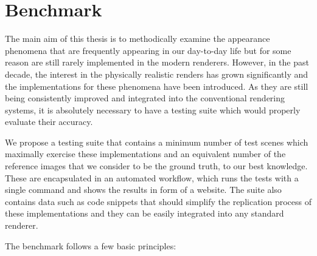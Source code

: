 \chapter{Benchmark}
\label{chap:benchmark}

The main aim of this thesis is to methodically examine the appearance phenomena that are frequently appearing in our day-to-day life but for some reason are still rarely implemented in the modern renderers. However, in the past decade, the interest in the physically realistic renders has grown significantly and the implementations for these phenomena have been introduced. As they are still being consistently improved and integrated into the conventional rendering systems, it is absolutely necessary to have a testing suite which would properly evaluate their accuracy.

We propose a testing suite that contains a minimum number of test scenes which maximally exercise these implementations and an equivalent number of the reference images that we consider to be the ground truth, to our best knowledge. These are encapsulated in an automated workflow, which runs the tests with a single command and shows the results in form of a website. The suite also contains data such as code snippets that should simplify the replication process of these implementations and they can be easily integrated into any standard renderer.

The benchmark follows a few basic principles:

